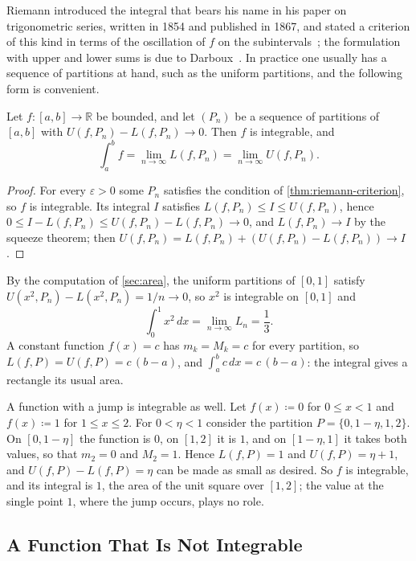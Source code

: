 Riemann introduced the integral that bears his name in his paper on trigonometric series, written in 1854 and published in 1867, and stated a criterion of this kind in terms of the oscillation of $f$ on the subintervals~\cite{riemann1867}; the formulation with upper and lower sums is due to Darboux~\cite{darboux1875}. In practice one usually has a sequence of partitions at hand, such as the uniform partitions, and the following form is convenient.

\begin{corollary}
\label{cor:riemann-sequence}
Let $f\colon[a,b]\to\mathbb R$ be bounded, and let $(P_n)$ be a sequence of partitions of $[a,b]$ with $U(f,P_n)-L(f,P_n)\to0$. Then $f$ is integrable, and
\[
\int_a^bf=\lim_{n\to\infty}L(f,P_n)=\lim_{n\to\infty}U(f,P_n).
\]
\end{corollary}

\begin{proof}
For every $\varepsilon>0$ some $P_n$ satisfies the condition of \cref{thm:riemann-criterion}, so $f$ is integrable. Its integral $I$ satisfies $L(f,P_n)\le I\le U(f,P_n)$, hence $0\le I-L(f,P_n)\le U(f,P_n)-L(f,P_n)\to0$, and $L(f,P_n)\to I$ by the squeeze theorem; then $U(f,P_n)=L(f,P_n)+(U(f,P_n)-L(f,P_n))\to I$.
\end{proof}

By the computation of \cref{sec:area}, the uniform partitions of $[0,1]$ satisfy $U(x^2,P_n)-L(x^2,P_n)=1/n\to0$, so $x^2$ is integrable on $[0,1]$ and
\[
\int_0^1x^2\,dx=\lim_{n\to\infty}L_n=\frac13 .
\]
A constant function $f(x)=c$ has $m_k=M_k=c$ for every partition, so $L(f,P)=U(f,P)=c\,(b-a)$, and $\int_a^bc\,dx=c\,(b-a)$: the integral gives a rectangle its usual area.

A function with a jump is integrable as well. Let $f(x)\coloneqq0$ for $0\le x<1$ and $f(x)\coloneqq1$ for $1\le x\le2$. For $0<\eta<1$ consider the partition $P=\{0,1-\eta,1,2\}$. On $[0,1-\eta]$ the function is $0$, on $[1,2]$ it is $1$, and on $[1-\eta,1]$ it takes both values, so that $m_2=0$ and $M_2=1$. Hence $L(f,P)=1$ and $U(f,P)=\eta+1$, and $U(f,P)-L(f,P)=\eta$ can be made as small as desired. So $f$ is integrable, and its integral is $1$, the area of the unit square over $[1,2]$; the value at the single point $1$, where the jump occurs, plays no role.

\subsection{A Function That Is Not Integrable}

